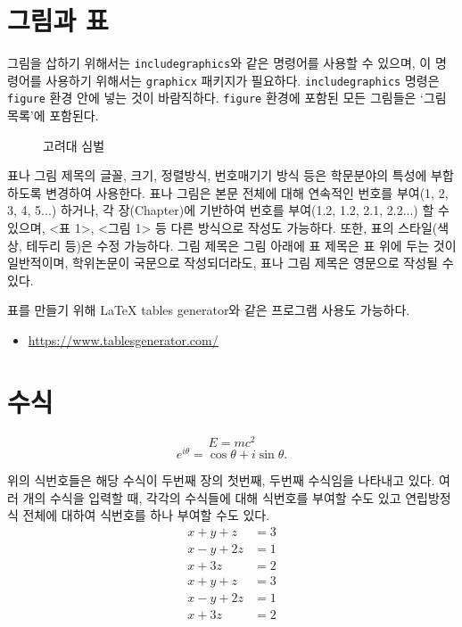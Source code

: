 \documentclass[11pt]{report}
\begin{document}
\newpage
\section{그림과 표}\label{sec:figures_and_table}

그림을 삽하기 위해서는 \texttt{includegraphics}와 같은 명령어를 사용할 수 있으며, 이 명령어를 사용하기 위해서는 \texttt{graphicx} 패키지가 필요하다.
\texttt{includegraphics} 명령은 \texttt{figure} 환경 안에 넣는 것이 바람직하다.
\texttt{figure} 환경에 포함된 모든 그림들은 `그림 목록'에 포함된다.

\renewcommand\figurename{그림}
\begin{figure}
\begin{center}
\vspace{0.5cm}
\end{center}
\caption{고려대 심벌}
\end{figure}

표나 그림 제목의 글꼴, 크기, 정렬방식, 번호매기기 방식 등은 학문분야의 특성에 부합하도록 변경하여 사용한다. 표나 그림은 본문 전체에 대해 연속적인 번호를 부여(1, 2, 3, 4, 5...) 하거나, 각 장(Chapter)에 기반하여 번호를 부여(1.2, 1.2, 2.1, 2.2...) 할 수 있으며, <표 1>, <그림 1> 등 다른 방식으로 작성도 가능하다. 또한, 표의 스타일(색상, 테두리 등)은 수정 가능하다. 그림 제목은 그림 아래에 표 제목은 표 위에 두는 것이 일반적이며, 학위논문이 국문으로 작성되더라도, 표나 그림 제목은 영문으로 작성될 수 있다. \par

\bigskip

표를 만들기 위해 LaTeX tables generator와 같은 프로그램 사용도 가능하다. \par
\begin{itemize}
\item
\url{https://www.tablesgenerator.com/}
\end{itemize}



\section{수식}\label{sec:equation}

\begin{equation}
E=mc^2
\end{equation}
\begin{equation}
e^{i\theta}=\cos\theta+i\sin\theta.
\end{equation}

위의 식번호들은 해당 수식이 두번째 장의 첫번째, 두번째 수식임을 나타내고 있다. 여러 개의 수식을 입력할 때, 각각의 수식들에 대해 식번호를 부여할 수도 있고 연립방정식 전체에 대하여 식번호를 하나 부여할 수도 있다.
\begin{align}
x+y+z&=3\\
x-y+2z&=1\\
x+3z&=2
\end{align}
\begin{equation}
\begin{aligned}
x+y+z&=3\\
x-y+2z&=1\\
x+3z&=2
\end{aligned}
\end{equation}
\end{document}
